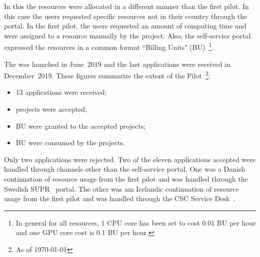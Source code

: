 
In this \pilot the resources were allocated in a different manner than the first pilot.
In this case the users requested specific resources not in their country through the portal. 
In the first pilot, the users requested an amount of computing time and were assigned to a resource manually by the \dell project.
Also, the self-service portal expressed the \einfra resources in a common format ``Billing Units" (BU)~\footnote{In general for all \dell resources, 1 CPU core has been set to cost 0.01 BU per hour and one GPU core cost is 0.1 BU per hour.}.

The \dell \pilot was launched in June~2019 and the last applications were received in December~2019. 
These figures summarize the extent of the Pilot~\footnote{As of \today}:
\begin{itemize}
\item 13 applications were received;
\item \accepted projects were accepted;
\item \BUalloc BU were granted to the accepted projects;
\item \BUcons BU were consumed by the projects.
\end{itemize}
Only two applications were rejected. 
Two of the eleven applications accepted were handled through channels other than the self-service portal.
One was a Danish continuation of resource usage from the first \dell pilot and was handled through the Swedish SUPR~\cite{supr} portal.
The other was am Icelandic continuation of resource usage from the first \dell pilot and was handled through the CSC Service Desk~\cite{csc-service-desk}.


